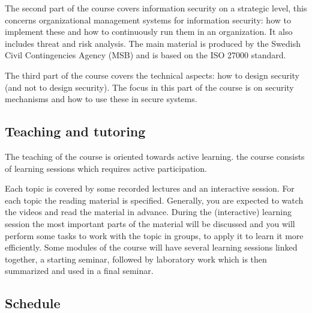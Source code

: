 The second part of the course covers information security on a strategic level, 
this concerns organizational management systems for information security: how 
to implement these and how to continuously run them in an organization.
It also includes threat and risk analysis.
The main material is produced by the Swedish Civil Contingencies Agency (MSB) 
and is based on the ISO 27000 standard.

The third part of the course covers the technical aspects: how to design 
security (and not to design security).
The focus in this part of the course is on security mechanisms and how to use 
these in secure systems.

\subsection{Teaching and tutoring}


The teaching of the course is oriented towards active learning.
\Ie the course consists of learning sessions which requires active 
participation.

Each topic is covered by some recorded lectures and an interactive session.
For each topic the reading material is specified.
Generally, you are expected to watch the videos and read the material in 
advance.
During the (interactive) learning session the most important parts of the 
material will be discussed and you will perform some tasks to work with the 
topic in groups, \ie to apply it to learn it more efficiently.
Some modules of the course will have several learning sessions linked together,
\eg a starting seminar, followed by laboratory work which is then summarized 
and used in a final seminar.

\subsection{Schedule}

